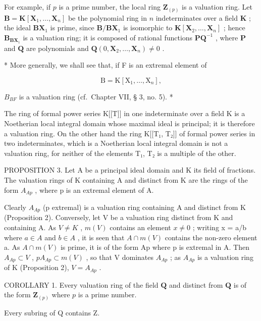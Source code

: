 For example, if \(p\) is a prime number, the local ring \(\mathbf{Z}_{(p)}\) is a valuation ring. Let \(\mathbf{B} = \mathbf{K}[\mathbf{X}_1, \ldots, \mathbf{X}_n]\) be the polynomial ring in \(n\) indeterminates over a field \(\mathbf{K}\) ; the ideal \(\mathbf{BX}_1\) is prime, since \(\mathbf{B} / \mathbf{BX}_1\) is isomorphic to \(\mathbf{K}[\mathbf{X}_2, \ldots, \mathbf{X}_n]\) ; hence \(\mathbf{B}_{\mathbf{BX}_1}\) is a valuation ring; it is composed of rational functions \(\mathbf{PQ}^{-1}\) , where \(\mathbf{P}\) and \(\mathbf{Q}\) are polynomials and \(\mathbf{Q}(0, \mathbf{X}_2, \ldots, \mathbf{X}_n) \neq 0\) .

* More generally, we shall see that, if F is an extremal element of

\[
\mathrm{B} = \mathrm{K} [ \mathrm{X} _ {1}, \dots , \mathrm{X} _ {n} ],
\]

\(B_{BF}\) is a valuation ring (cf.~Chapter VII, § 3, no. 5). *

The ring of formal power series K{[}{[}T{]}{]} in one indeterminate over a field K is a Noetherian local integral domain whose maximal ideal is principal; it is therefore a valuation ring. On the other hand the ring K{[}{[}T₁, T₂{]}{]} of formal power series in two indeterminates, which is a Noetherian local integral domain is not a valuation ring, for neither of the elements T₁, T₂ is a multiple of the other.

PROPOSITION 3. Let A be a principal ideal domain and K its field of fractions. The valuation rings of K containing A and distinct from K are the rings of the form \(A_{Ap}\) , where p is an extremal element of A.

Clearly \(A_{Ap}\) (p extremal) is a valuation ring containing A and distinct from K (Proposition 2). Conversely, let V be a valuation ring distinct from K and containing A. As \(V \neq K\) , \(m(V)\) contains an element \(x \neq 0\) ; writing x = a/b where \(a \in A\) and \(b \in A\) , it is seen that \(A \cap m(V)\) contains the non-zero element a. As \(A \cap m(V)\) is prime, it is of the form Ap where p is extremal in A. Then \(A_{Ap} \subset V\) , \(pA_{Ap} \subset m(V)\) , so that V dominates \(A_{Ap}\) ; as \(A_{Ap}\) is a valuation ring of K (Proposition 2), \(V = A_{Ap}\) .

COROLLARY 1. Every valuation ring of the field \(\mathbf{Q}\) and distinct from \(\mathbf{Q}\) is of the form \(\mathbf{Z}_{(p)}\) where \(p\) is a prime number.

Every subring of Q contains Z.

